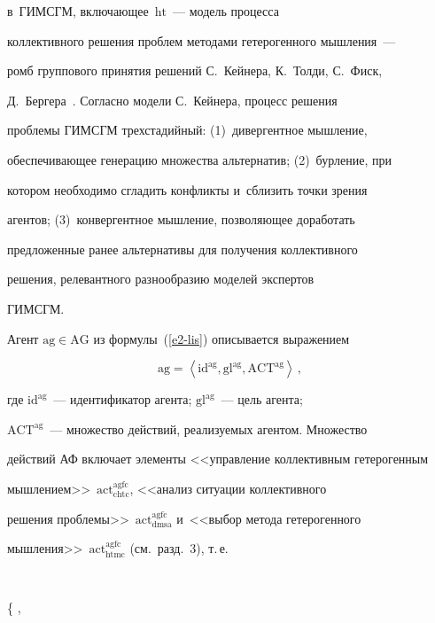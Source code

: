 в~\mbox{ГИМСГМ}, включающее~$\mathrm{ht}$~--- модель процесса 


коллективного решения проблем методами гетерогенного мышления~--- 


ромб группового принятия решений С.~Кейнера, К.~Толди, С.~Фиск, 


Д.~Бергера~\cite{10-lis}. Согласно модели С.~Кейнера, процесс решения 


проблемы ГИМСГМ трехстадийный: (1)~дивергентное мышление, 


обеспечивающее генерацию множества альтернатив; (2)~бурление, при 


котором необходимо сгладить конфликты и~сблизить точки зрения 


агентов; (3)~конвергентное мышление, позволяющее доработать 


предложенные ранее альтернативы для получения коллективного 


решения, релевантного разнообразию моделей экспертов 


\mbox{ГИМСГМ}. 


  


 


 


  


  Агент $\mathrm{ag}\in \mathrm{AG}$ из формулы~(\ref{e2-lis}) описывается выражением


  $$


  \mathrm{ag}=\left\langle \mathrm{id}^{\mathrm{ag}}, \mathrm{gl}^{\mathrm{ag}}, 


  \mathrm{ACT}^{\mathrm{ag}}\right\rangle\,,


  $$


где $\mathrm{id^{ag}}$~--- идентификатор агента; $\mathrm{gl^{ag}}$~--- цель агента; 


$\mathrm{ACT^{ag}}$~--- множество действий, реализуемых агентом. Множество 


действий АФ включает элементы <<управление коллективным гетерогенным 


мышлением>>~$\mathrm{act_{chtc}^{agfc}}$, <<анализ ситуации коллективного 


решения проблемы>>~$\mathrm{act^{agfc}_{dmsa}}$ и~<<выбор метода гетерогенного 


мышления>>~$\mathrm{act_{htmc}^{agfc}}$ (см.\ разд.~3), т.\,е.\


$$


\left\{ , 



